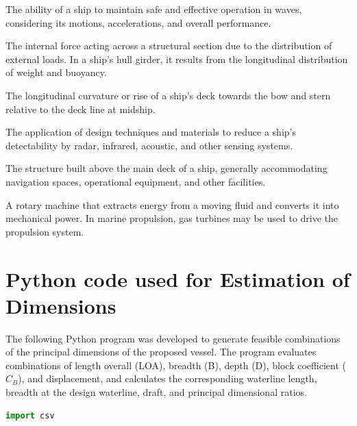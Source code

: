 \begin{appendices}
\begin{description}[
    leftmargin=4.3cm,
    labelwidth=3.8cm,
    labelsep=0.25cm,
    align=left,
    style=multiline,
    itemsep=0.65em,
    parsep=0pt,
    font=\normalfont\bfseries
]
\item[Seakeeping]
The ability of a ship to maintain safe and effective operation in waves, considering its motions, accelerations, and overall performance.

\item[Shear Force]
The internal force acting across a structural section due to the distribution of external loads. In a ship's hull girder, it results from the longitudinal distribution of weight and buoyancy.

\item[Sheer]
The longitudinal curvature or rise of a ship's deck towards the bow and stern relative to the deck line at midship.

\item[Stealth Design]
The application of design techniques and materials to reduce a ship's detectability by radar, infrared, acoustic, and other sensing systems.

\item[Superstructure]
The structure built above the main deck of a ship, generally accommodating navigation spaces, operational equipment, and other facilities.

\item[Turbine]
A rotary machine that extracts energy from a moving fluid and converts it into mechanical power. In marine propulsion, gas turbines may be used to drive the propulsion system.

\end{description}


\chapter{Python code used for  Estimation of Dimensions}
\label{app:ship_dimension_generator}

The following Python program was developed to generate feasible
combinations of the principal dimensions of the proposed vessel.
The program evaluates combinations of length overall (LOA), breadth
(B), depth (D), block coefficient ($C_B$), and displacement, and
calculates the corresponding waterline length, breadth at the design
waterline, draft, and principal dimensional ratios.

\begin{lstlisting}[language=Python,
    caption={Python program for generating feasible ship main dimensions},
    label={lst:ship_dimension_generator}]
import csv


\end{lstlisting}
\end{appendices}
